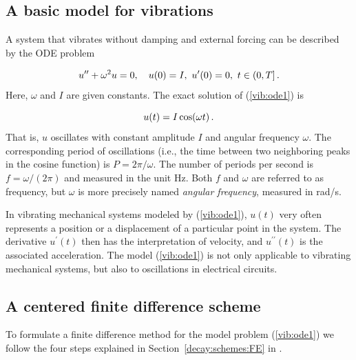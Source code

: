 \documentclass[%
oneside,                 %
final,                   %
10pt]{article}
\begin{document}
\subsection{A basic model for vibrations}

  

A system that vibrates without damping and external forcing
can be described by the ODE problem

\begin{equation}
u^{\prime\prime} + \omega^2u = 0,\quad u(0)=I,\ u^{\prime}(0)=0,\ t\in (0,T]
\tp
\label{vib:ode1}
\end{equation}
Here, $\omega$ and $I$ are given constants.
The exact solution of (\ref{vib:ode1}) is


\begin{equation}
u(t) = I\cos (\omega t)
\tp
\label{vib:ode1:uex}
\end{equation}
That is, $u$ oscillates with constant amplitude $I$ and
angular frequency $\omega$.
The corresponding period of oscillations (i.e., the time between two
neighboring peaks in the cosine function) is $P=2\pi/\omega$.
The number of periods per second
is $f=\omega/(2\pi)$ and measured in the unit Hz.
Both $f$ and $\omega$ are referred to as frequency, but $\omega$
is more precisely named \emph{angular frequency}, measured in rad/s.

In vibrating mechanical systems modeled by (\ref{vib:ode1}), $u(t)$
very often represents a position or a displacement of a particular
point in the system. The derivative $u^{\prime}(t)$ then has the
interpretation of velocity, and $u^{\prime\prime}(t)$ is the associated
acceleration.  The model (\ref{vib:ode1}) is not only
applicable to vibrating mechanical systems, but also to oscillations
in electrical circuits.

\subsection{A centered finite difference scheme}
\label{vib:ode1:fdm}

To formulate a finite difference method for the model
problem  (\ref{vib:ode1}) we follow the four steps explained in Section~\ref{decay:schemes:FE} in \cite{Langtangen_decay}.

 
\end{document}
